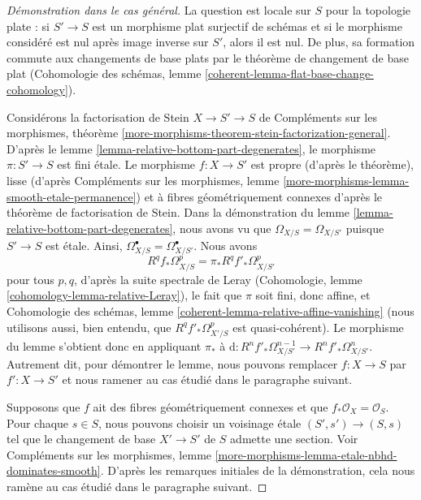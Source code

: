 \begin{proof}[Démonstration dans le cas général]
La question est locale sur $S$ pour la topologie plate : si $S' \to S$ est un morphisme
plat surjectif de schémas et si le morphisme considéré est nul après image inverse sur $S'$,
alors il est nul. De plus, sa formation commute aux changements de base
plats par le théorème de changement de base plat (Cohomologie des schémas, lemme
\ref{coherent-lemma-flat-base-change-cohomology}).

\medskip\noindent
Considérons la factorisation de Stein $X \to S' \to S$ de
Compléments sur les morphismes, théorème
\ref{more-morphisms-theorem-stein-factorization-general}.
D'après le lemme \ref{lemma-relative-bottom-part-degenerates}, le morphisme
$\pi : S' \to S$ est fini étale.
Le morphisme $f : X \to S'$ est propre (d'après le théorème),
lisse (d'après Compléments sur les morphismes, lemme
\ref{more-morphisms-lemma-smooth-etale-permanence}) et à fibres géométriquement
connexes d'après le théorème de factorisation de Stein.
Dans la démonstration du lemme \ref{lemma-relative-bottom-part-degenerates},
nous avons vu que $\Omega_{X/S} = \Omega_{X/S'}$ puisque $S' \to S$ est étale.
Ainsi, $\Omega^\bullet_{X/S} = \Omega^\bullet_{X/S'}$.
Nous avons
$$
R^qf_*\Omega^p_{X/S} = \pi_*R^qf'_*\Omega^p_{X/S'}
$$
pour tous $p, q$, d'après la suite spectrale de Leray
(Cohomologie, lemme \ref{cohomology-lemma-relative-Leray}),
le fait que $\pi$ soit fini, donc affine, et
Cohomologie des schémas, lemme \ref{coherent-lemma-relative-affine-vanishing}
(nous utilisons aussi, bien entendu, que $R^qf'_*\Omega^p_{X'/S}$ est
quasi-cohérent).
Le morphisme du lemme s'obtient donc en appliquant $\pi_*$ à
$\text{d} : R^nf'_*\Omega^{n - 1}_{X/S'} \to R^nf'_*\Omega^n_{X/S'}$.
Autrement dit, pour démontrer le lemme, nous pouvons remplacer
$f : X \to S$ par $f' : X \to S'$ et nous ramener au cas étudié
dans le paragraphe suivant.

\medskip\noindent
Supposons que $f$ ait des fibres géométriquement connexes et que
$f_*\mathcal{O}_X = \mathcal{O}_S$.
Pour chaque $s \in S$, nous pouvons choisir un voisinage étale
$(S', s') \to (S, s)$ tel que le changement de base $X' \to S'$ de $S$
admette une section. Voir Compléments sur les morphismes, lemme
\ref{more-morphisms-lemma-etale-nbhd-dominates-smooth}.
D'après les remarques initiales de la démonstration, cela nous ramène au cas
étudié dans le paragraphe suivant.


\end{proof}
